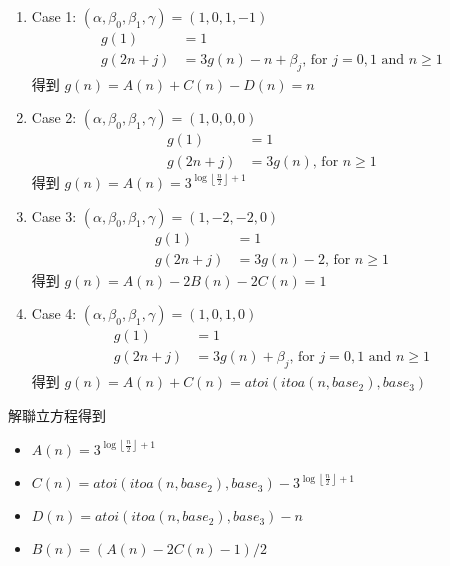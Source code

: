 \documentclass[11pt]{article}
\begin{document}
\begin{enumerate}
	\item Case 1: $(\alpha, \beta_0, \beta_1, \gamma) = (1, 0, 1, -1)$
		\begin{equation}
		\begin{split}
			g(1) &= 1 \\ 
			g(2n+j) &= 3g(n)-n + \beta_j \text{, for } j = 0, 1 \text{ and } n \ge 1
		\end{split}
		\end{equation}
		得到 $g(n) = A(n) + C(n) - D(n) = n$
	\item Case 2: $(\alpha, \beta_0, \beta_1, \gamma) = (1, 0, 0, 0)$
		\begin{equation}
		\begin{split}
			g(1) &= 1 \\ 
			g(2n+j) &= 3g(n) \text{, for } n \ge 1
		\end{split}
		\end{equation}
		得到 $g(n) = A(n) = 3^{\log \left \lfloor \frac{n}{2} \right \rfloor + 1}$
	\item Case 3: $(\alpha, \beta_0, \beta_1, \gamma) = (1, -2, -2, 0)$
		\begin{equation}
		\begin{split}
			g(1) &= 1 \\ 
			g(2n+j) &= 3g(n) - 2\text{, for } n \ge 1
		\end{split}
		\end{equation}
		得到 $g(n) = A(n) - 2 B(n) - 2 C(n) = 1$
	\item Case 4: $(\alpha, \beta_0, \beta_1, \gamma) = (1, 0, 1, 0)$
		\begin{equation}
		\begin{split}
			g(1) &= 1 \\ 
			g(2n+j) &= 3g(n) + \beta_j \text{, for } j = 0, 1 \text{ and }n \ge 1
		\end{split}
		\end{equation}
		得到 $g(n) = A(n) + C(n) = \textit{atoi}(\textit{itoa}(n, base_2), base_3)$
\end{enumerate}

解聯立方程得到 

\begin{itemize}
	\item $A(n) = 3^{\log \left \lfloor \frac{n}{2} \right \rfloor + 1}$
	\item $C(n) = \textit{atoi}(\textit{itoa}(n, base_2), base_3) - 3^{\log \left \lfloor \frac{n}{2} \right \rfloor + 1}$
	\item $D(n) = \textit{atoi}(\textit{itoa}(n, base_2), base_3) - n$
	\item $B(n) = (A(n) - 2 C(n) - 1) / 2$
\end{itemize}
\end{document}
